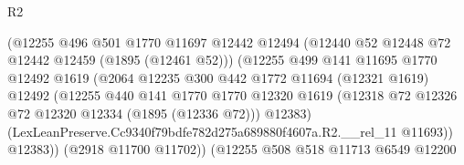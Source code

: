 \begin{lexlean}{R2}
\begin{coremodule}
                                        (@12255
                                          @496
                                          @501
                                          @1770
                                          @11697
                                          @12442
                                          @12494
                                          (@12440 @52 @12448 @72 @12442 @12459 (@1895 (@12461 @52)))
                                          (@12255
                                            @499
                                            @141
                                            @11695
                                            @1770
                                            @12492
                                            @1619
                                            (@2064
                                              @12235
                                              @300
                                              @442
                                              @1772
                                              @11694
                                              (@12321 @1619)
                                              @12492
                                              (@12255
                                                @440
                                                @141
                                                @1770
                                                @1770
                                                @12320
                                                @1619
                                                (@12318
                                                  @72
                                                  @12326
                                                  @72
                                                  @12320
                                                  @12334
                                                  (@1895 (@12336 @72)))
                                                @12383)
                                              (LexLeanPreserve.Cc9340f79bdfe782d275a689880f4607a.R2.__rel_11
                                                @11693))
                                            @12383))
                                        (@2918 @11700 @11702))
                                      (@12255
                                        @508
                                        @518
                                        @11713
                                        @6549
                                        @12200

\end{coremodule}
\end{lexlean}
